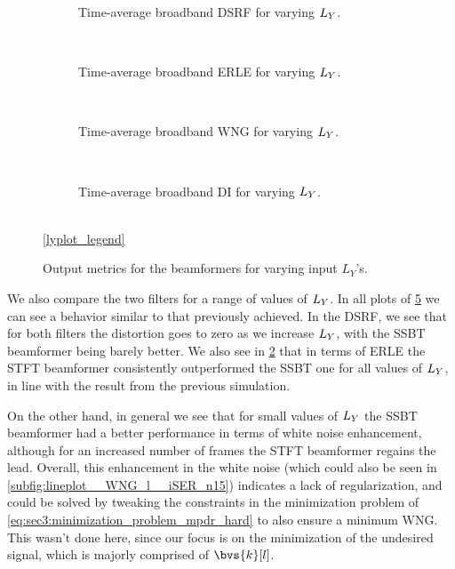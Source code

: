 \begin{figure}[!ht]
	\centering
	\begin{subfigure}{\textwidth}
		\centering
		
		\caption{Time-average broadband DSRF for varying $\Ly$.}
		\label{subfig:lineplot__DSRF__iSER_n15__Ly_var}
	\end{subfigure}\\[1em]
	\begin{subfigure}{\textwidth}
		\centering
		
		\caption{Time-average broadband ERLE for varying $\Ly$.}
		\label{subfig:lineplot__ERLE__iSER_n15__Ly_var}
	\end{subfigure}\\[1em]
	\begin{subfigure}{\textwidth}
		\centering
		
		\caption{Time-average broadband WNG for varying $\Ly$.}
		\label{subfig:lineplot__WNG__iSER_n15__Ly_var}
	\end{subfigure}\\[1em]
	\begin{subfigure}{\textwidth}
		\centering
		
		\caption{Time-average broadband DI for varying $\Ly$.}
		\label{subfig:lineplot__DI__iSER_n15__Ly_var}
	\end{subfigure}\\[1em]
	\ref*{lyplot_legend}
	\caption{Output metrics for the beamformers for varying input $L_Y$'s.}
	\label{fig:lineplot__iSER_n15__Ly_var}
\end{figure}

We also compare the two filters for a range of values of $\Ly$. In all plots of \cref{fig:lineplot__iSER_n15__Ly_var} we can see a behavior similar to that previously achieved. In the DSRF, we see that for both filters the distortion goes to zero as we increase $\Ly$, with the SSBT beamformer being barely better. We also see in \cref{subfig:lineplot__ERLE__iSER_n15__Ly_var} that in terms of ERLE the STFT beamformer consistently outperformed the SSBT one for all values of $\Ly$, in line with the result from the previous simulation.

On the other hand, in general we see that for small values of $\Ly$ the SSBT beamformer had a better performance in terms of white noise enhancement, although for an increased number of frames the STFT beamformer regains the lead. Overall, this enhancement in the white noise (which could also be seen in \cref{subfig:lineplot__WNG_l__iSER_n15}) indicates a lack of regularization, and could be solved by tweaking the constraints in the minimization problem of \cref{eq:sec3:minimization_problem_mpdr_hard} to also ensure a minimum WNG. This wasn't done here, since our focus is on the minimization of the undesired signal, which is majorly comprised of $\bvs{k}[l]$.


